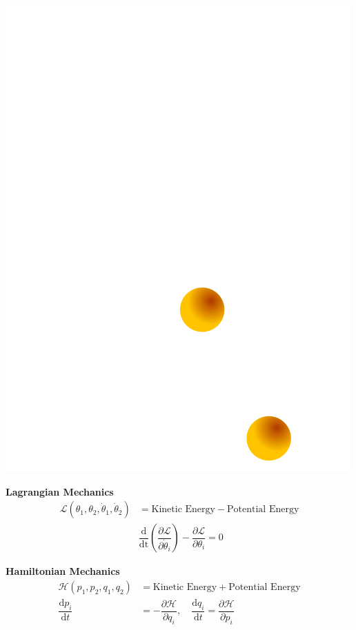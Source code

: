 \documentclass[usenames,dvipsnames,svgnames,10pt,aspectratio=169]{beamer}
\begin{document}
\begin{frame}[t, c]{}{}
	\begin{minipage}{.28\textwidth}
		\centering
		\includegraphics[width=.9\textwidth]{double_pendulum_geometry}
	\end{minipage}%
	\hfill
	\begin{minipage}{.68\textwidth}
    \begin{overprint}
      \centering
      \textbf{Lagrangian Mechanics}
      \[
      \begin{aligned}
        \mathcal{L}(\theta_1, \theta_2, \dot{\theta}_1, \dot{\theta}_2) & = \text{Kinetic Energy} - \text{Potential Energy} \\
        & \dfrac{\mathrm{d}}{\mathrm{dt}} \left( \dfrac{\partial \mathcal{L}}{\partial \dot{\theta}_i} \right) - \dfrac{\partial \mathcal{L}}{\partial \theta_i}  = 0
      \end{aligned}
      \]

      \centering
      \textbf{Hamiltonian Mechanics}
      \[
      \begin{aligned}
        \mathcal{H}(p_1, p_2, q_1, q_2) & = \text{Kinetic Energy} + \text{Potential Energy} \\
        \dfrac{\mathrm{d}p_i}{\mathrm{d}t} & = -\dfrac{\partial \mathcal{H}}{\partial q_i}, \quad \dfrac{\mathrm{d}q_i}{\mathrm{d}t} = \dfrac{\partial \mathcal{H}}{\partial p_i}
      \end{aligned}
      \]
    \end{overprint}
	\end{minipage}


\end{frame}
\end{document}
